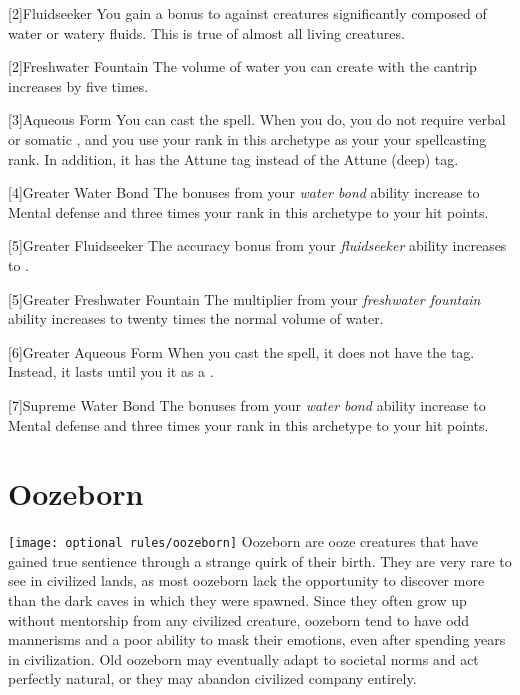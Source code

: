        [2]{Fluidseeker} You gain a  bonus to  against creatures significantly composed of water or watery fluids.
        This is true of almost all living creatures.

        [2]{Freshwater Fountain} The volume of water you can create with the  cantrip increases by five times.

        [3]{Aqueous Form} You can cast the  spell.
        When you do, you do not require verbal or somatic , and you use your rank in this archetype as your your spellcasting rank.
        In addition, it has the Attune tag instead of the Attune (deep) tag.

        [4]{Greater Water Bond} The bonuses from your \textit{water bond} ability increase to  Mental defense and three times your rank in this archetype to your hit points.

        [5]{Greater Fluidseeker} The accuracy bonus from your \textit{fluidseeker} ability increases to .

        [5]{Greater Freshwater Fountain} The multiplier from your \textit{freshwater fountain} ability increases to twenty times the normal volume of water.

        [6]{Greater Aqueous Form} When you cast the  spell, it does not have the  tag.
        Instead, it lasts until you  it as a .

        [7]{Supreme Water Bond} The bonuses from your \textit{water bond} ability increase to  Mental defense and three times your rank in this archetype to your hit points.

\section{Oozeborn}
    \texttt{[image: optional rules/oozeborn]}
    Oozeborn are ooze creatures that have gained true sentience through a strange quirk of their birth.
    They are very rare to see in civilized lands, as most oozeborn lack the opportunity to discover more than the dark caves in which they were spawned.
    Since they often grow up without mentorship from any civilized creature, oozeborn tend to have odd mannerisms and a poor ability to mask their emotions, even after spending years in civilization.
    Old oozeborn may eventually adapt to societal norms and act perfectly natural, or they may abandon civilized company entirely.

